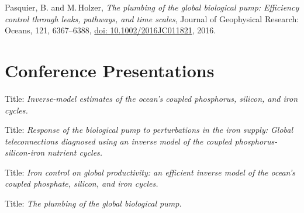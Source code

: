 \documentclass[]{friggeri-cv}
\begin{document}
Pasquier, B. and M.\,Holzer, \emph{The plumbing of the global biological pump: Efficiency control through leaks, pathways, and time scales}, Journal of Geophysical Research: Oceans, 121, 6367--6388, \href{http://dx.doi.org/10.1002/2016JC011821}{doi: 10.1002/2016JC011821}, 2016.








\newpage

\section{Con{\color{pblue}f}erence {\color{pblue}Pres}entations}
\begin{entrylist}

  {Title: \emph{Inverse-model estimates of the ocean's coupled phosphorus, silicon, and iron cycles.}
  }

  {Title: \emph{Response of the biological pump to perturbations in the iron supply: Global teleconnections diagnosed using an inverse model of the coupled phosphorus-silicon-iron nutrient cycles.}
  }

  {Title: \emph{Iron control on global productivity: an efficient inverse model of the ocean's coupled phosphate, silicon, and iron cycles.}
  }

  {Title: \emph{The plumbing of the global biological pump.}
  }



\end{entrylist}
\end{document}
